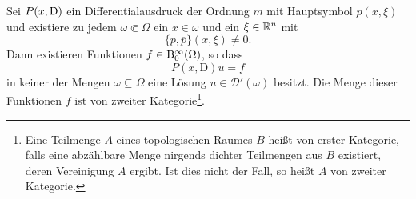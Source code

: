 \begin{thm}\label{thm:2_hoer}
Sei $P(x,\mathrm D)$ ein Differentialausdruck der Ordnung $m$ mit  Hauptsymbol $p(x,\xi)$ und existiere zu jedem $\omega\Subset\Omega$ 
ein $x\in\omega$ und ein $\xi\in\mathbb R^n$ mit
\begin{equation}
 \{p,\overline p\}(x,\xi)\ne 0.
\end{equation}
Dann existieren Funktionen $f\in \mathrm B_0^\infty(\Omega)$, so dass
\begin{equation}\label{lewy:pxDu=f}
P(x,\mathrm D)u=f
\end{equation}
in keiner der Mengen $\omega\subseteq\Omega$ eine Lösung $u\in\mathscr D'(\omega)$ besitzt. Die Menge dieser Funktionen $f$ ist von zweiter Kategorie\footnote{Eine Teilmenge $A$ eines topologischen Raumes $B$ heißt von erster Kategorie, falls eine abzählbare Menge nirgends dichter Teilmengen aus $B$ existiert, deren Vereinigung $A$ ergibt. Ist dies nicht der Fall, so heißt $A$ von zweiter Kategorie.}.
\end{thm}

